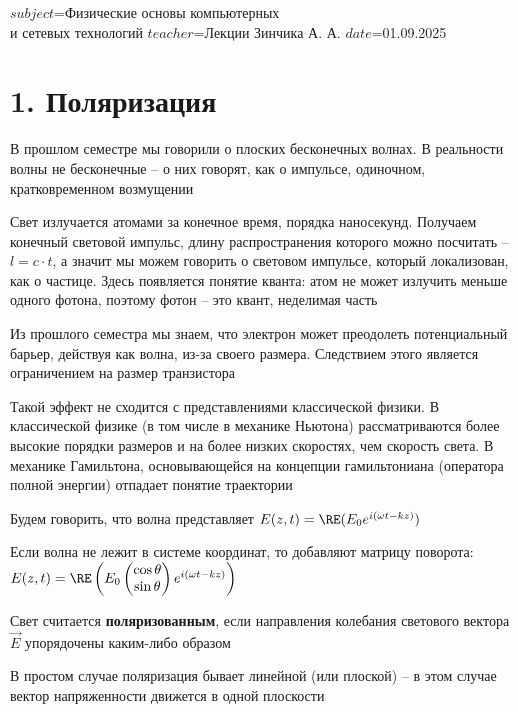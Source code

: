 $subject$=Физические основы компьютерных \\ и сетевых технологий
$teacher$=Лекции Зинчика А. А.
$date$=01.09.2025

\section{1. Поляризация}

В прошлом семестре мы говорили о плоских бесконечных волнах. В реальности волны не бесконечные -- о них говорят, как о импульсе, одиночном, кратковременном возмущении

Свет излучается атомами за конечное время, порядка наносекунд. Получаем конечный световой импульс, длину распространения которого можно посчитать -- $l = c \cdot t$, а значит мы можем говорить о световом импульсе, который локализован, как о частице. Здесь появляется понятие кванта: атом не может излучить меньше одного фотона, поэтому фотон -- это квант, неделимая часть

Из прошлого семестра мы знаем, что электрон может преодолеть потенциальный барьер, действуя как волна, из-за своего размера. Следствием этого является ограничением на размер транзистора

Такой эффект не сходится с представлениями классической физики. В классической физике (в том числе в механике Ньютона) рассматриваются более высокие порядки размеров и на более низких скоростях, чем скорость света.
В механике Гамильтона, основывающейся на концепции гамильтониана (оператора полной энергии) отпадает понятие траектории

\mediumvspace

Будем говорить, что волна представляет $E(z, t) = \RE(E_0 e^{i(\omega t - kz)})$

Если волна не лежит в системе координат, то добавляют матрицу поворота: $E(z, t) = \RE\left(E_0 \begin{pmatrix}\cos \theta \\ \sin \theta \end{pmatrix} e^{i(\omega t - kz)}\right)$

\smallvspace

Свет считается \textbf{поляризованным}, если направления колебания светового вектора $\vec E$ упорядочены каким-либо образом


В простом случае поляризация бывает линейной (или плоской) -- в этом случае вектор напряженности движется в одной плоскости

